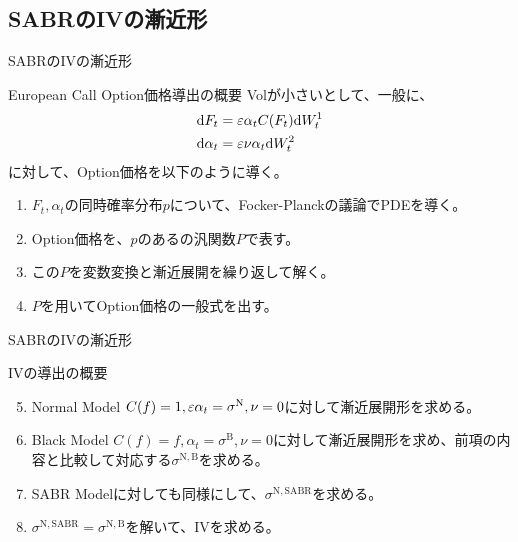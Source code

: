 \documentclass[dvipdfmx,9pt]{beamer}
\begin{document}
\subsection{SABRのIVの漸近形}
\begin{frame}{SABRのIVの漸近形}
  \begin{block}{European Call Option価格導出の概要}
    Volが小さいとして、一般に、
    \begin{align}
      \dd F_{t}      & = \varepsilon \alpha_{t} C(F_{t}) \dd W_{t}^{1} \\
      \dd \alpha_{t} & = \varepsilon \nu \alpha_{t} \dd W_{t}^{2}
    \end{align}
    に対して、Option価格を以下のように導く。
    \begin{enumerate}
      \item $F_{t},\alpha_{t}$の同時確率分布$p$について、Focker-Planckの議論でPDEを導く。
      \item Option価格を、$p$のあるの汎関数$P$で表す。
      \item この$P$を変数変換と漸近展開を繰り返して解く。
      \item $P$を用いてOption価格の一般式を出す。
    \end{enumerate}
  \end{block}
\end{frame}
\begin{frame}{SABRのIVの漸近形}
  \begin{block}{IVの導出の概要}
    \begin{enumerate}
      \setcounter{enumi}{4}
      \item Normal Model $C(f) = 1, \varepsilon\alpha_{t} = \sigma^{\mathrm{N}},\nu = 0$に対して漸近展開形を求める。
      \item Black Model $C(f) = f, \alpha_{t} = \sigma^{\mathrm{B}},\nu = 0$に対して漸近展開形を求め、前項の内容と比較して対応する$\sigma^{\mathrm{N,B}}$を求める。
      \item SABR Modelに対しても同様にして、$\sigma^{\mathrm{N,SABR}}$を求める。
      \item $\sigma^{\mathrm{N,SABR}} = \sigma^{\mathrm{N,B}}$を解いて、IVを求める。
    \end{enumerate}
  \end{block}
\end{frame}
\end{document}
